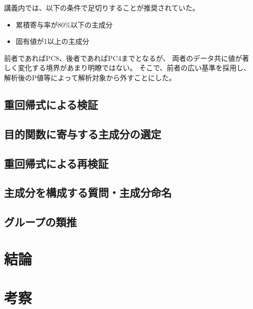 \documentclass[11pt,a4paper, uplatex]{jsarticle}
\begin{document}
講義内では、以下の条件で足切りすることが推奨されていた。

\begin{itemize}
  \item 累積寄与率が80\%以下の主成分
  \item 固有値が1以上の主成分
\end{itemize}

前者であればPC8、後者であればPC4までとなるが、
両者のデータ共に値が著しく変化する境界があまり明瞭ではない。
そこで、前者の広い基準を採用し、解析後のP値等によって解析対象から外すことにした。

\subsection{重回帰式による検証}

\subsection{目的関数に寄与する主成分の選定}

\subsection{重回帰式による再検証}
\subsection{主成分を構成する質問・主成分命名}
\subsection{グループの類推}


\section{結論}
\section{考察}
\end{document}
